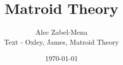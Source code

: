 \documentclass[12pt, twoside]{book}
\title{Matroid Theory}
\author{Alec Zabel-Mena \\ Text - Oxley, James, Matroid Theory \cite{oxley}}
\date{\today}
\begin{document}
\maketitle
\tableofcontents



\nocite{*}



\end{document}

